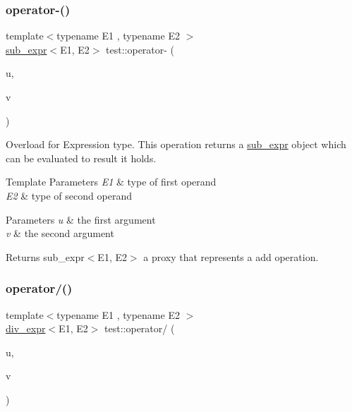\subsubsection{\texorpdfstring{operator-\/()}{operator-()}}
{\footnotesize\ttfamily template$<$typename E1 , typename E2 $>$ \\
\mbox{\hyperlink{classtest_1_1sub__expr}{sub\+\_\+expr}}$<$E1, E2$>$ test\+::operator-\/ (\begin{DoxyParamCaption}\item[{E1 const \&}]{u,  }\item[{E2 const \&}]{v }\end{DoxyParamCaption})}



Overload for Expression type. This operation returns a \mbox{\hyperlink{classtest_1_1sub__expr}{sub\+\_\+expr}} object which can be evaluated to result it holds. 


\begin{DoxyTemplParams}{Template Parameters}
{\em E1} & type of first operand \\
\hline
{\em E2} & type of second operand \\
\hline
\end{DoxyTemplParams}

\begin{DoxyParams}{Parameters}
{\em u} & the first argument \\
\hline
{\em v} & the second argument \\
\hline
\end{DoxyParams}
\begin{DoxyReturn}{Returns}
sub\+\_\+expr$<$\+E1, E2$>$ a proxy that represents a add operation. 
\end{DoxyReturn}
\mbox{\label{namespacetest_a3de54d71b553c223f2b4619023186a17}} 
\subsubsection{\texorpdfstring{operator/()}{operator/()}}
{\footnotesize\ttfamily template$<$typename E1 , typename E2 $>$ \\
\mbox{\hyperlink{classtest_1_1div__expr}{div\+\_\+expr}}$<$E1, E2$>$ test\+::operator/ (\begin{DoxyParamCaption}\item[{E1 const \&}]{u,  }\item[{E2 const \&}]{v }\end{DoxyParamCaption})}



